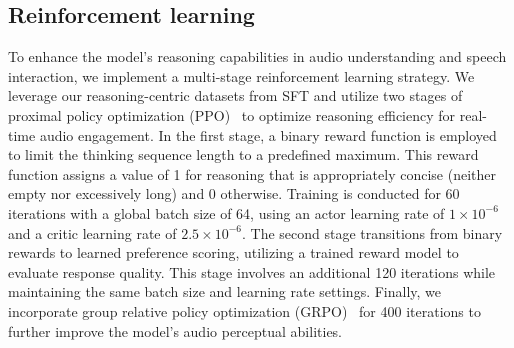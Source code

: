 \subsection{Reinforcement learning}




























To enhance the model's reasoning capabilities in audio understanding and speech interaction,
we implement a multi-stage reinforcement learning strategy.
We leverage our reasoning-centric datasets from SFT and utilize two stages of proximal policy optimization (PPO)~\cite{rafailov2023direct} to optimize reasoning efficiency for real-time audio engagement.
In the first stage, a binary reward function is employed to limit the thinking sequence length to a predefined maximum.
This reward function assigns a value of 1 for reasoning that is appropriately concise (neither empty nor excessively long) and 0 otherwise.
Training is conducted for 60 iterations with a global batch size of 64, using an actor learning rate of $1 \times 10^{-6}$ and a critic learning rate of $2.5 \times 10^{-6}$.
The second stage transitions from binary rewards to learned preference scoring, utilizing a trained reward model to evaluate response quality.
This stage involves an additional 120 iterations while maintaining the same batch size and learning rate settings. Finally, we incorporate group relative policy optimization (GRPO)~\cite{rafailov2023direct} for 400 iterations to further improve the model's audio perceptual abilities.





